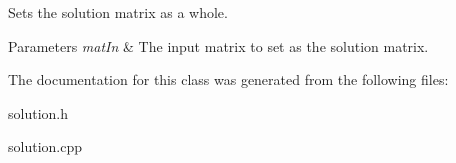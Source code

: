 Sets the solution matrix as a whole. 


\begin{DoxyParams}{Parameters}
{\em mat\-In} & The input matrix to set as the solution matrix. \\
\hline
\end{DoxyParams}


The documentation for this class was generated from the following files\-:\begin{DoxyCompactItemize}
\item 
solution.\-h\item 
solution.\-cpp\end{DoxyCompactItemize}
